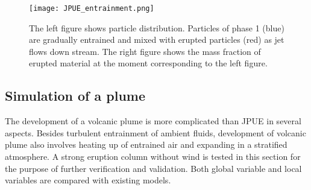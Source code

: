 \documentclass[gmd, manuscript]{copernicus} %
\providecommand{\DIFadd}[1]{{\protect\color{blue}\uwave{#1}}} %
\providecommand{\DIFaddbegin}{} %
\providecommand{\DIFaddend}{} %
\begin{document}
\begin{figure}
\texttt{[image: JPUE\_entrainment.png]}
\caption{The left figure shows particle distribution. Particles of phase 1 (blue) are gradually entrained and mixed with erupted particles (red) as jet flows down stream. The right figure shows the mass fraction of erupted material at the moment corresponding to the left figure.}
\label{fig:Turb_mixing}
\end{figure}

\subsection{Simulation of a \DIFaddbegin \DIFadd{volcanic }\DIFaddend plume}
The development of a volcanic plume is more complicated than JPUE in several aspects. Besides turbulent entrainment of ambient fluids, development of volcanic plume also involves heating up of entrained air and expanding in a stratified atmosphere. A strong eruption column without wind is tested in this section for the purpose of further verification and validation.
Both global variable and local variables are compared with existing models.
\end{document}
